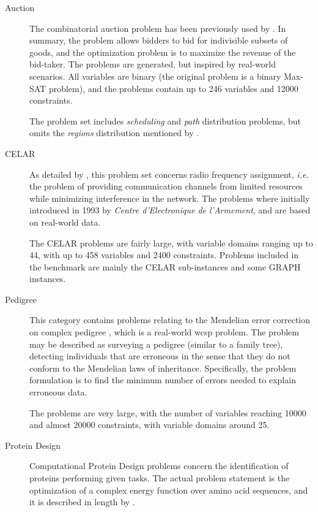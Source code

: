\begin{description}
	\item[Auction]
		The combinatorial auction problem has been previously used by \textcites{Larrosa08}{Sandholm99}.
		In summary, the problem allows bidders to bid for indivisible subsets of goods, and the optimization problem is to maximize the revenue of the bid-taker.
		The problems are generated, but inspired by real-world scenarios.
		All variables are binary (the original problem is a binary Max-SAT problem), and the problems contain up to \num{246} variables and \num{12000} constraints.

		The problem set includes \emph{scheduling} and \emph{path} distribution problems, but omits the \emph{regions} distribution mentioned by \textcite[\pno~228]{Larrosa08}.

	\item[CELAR]
		As detailed by \textcite{Cabon99}, this problem set concerns radio frequency assignment, \emph{i.e.} the problem of providing communication channels from limited resources while minimizing interference in the network.
		The problems where initially introduced in 1993 by \emph{Centre d’Electronique de l’Armement}, and are based on real-world data.

		The CELAR problems are fairly large, with variable domains ranging up to \num{44}, with up to \num{458} variables and \num{2400} constraints.
		Problems included in the benchmark are mainly the CELAR sub-instances \parencite[\pno~85]{Cabon99} and some GRAPH instances.

	\item[Pedigree]
		This category contains problems relating to the Mendelian error correction on complex pedigree \parencite{Sanchez08}, which is a real-world \gls{wcsp} problem.
		The problem may be described as surveying a pedigree (similar to a family tree), detecting individuals that are erroneous in the sense that they do not conform to the Mendelian laws of inheritance.
		Specifically, the problem formulation is to find the minimum number of errors needed to explain erroneous data.

		The problems are very large, with the number of variables reaching \num{10000} and almost \num{20000} constraints, with variable domains around \num{25}.

	\item[Protein Design]
		Computational Protein Design problems concern the identification of proteins performing given tasks. The actual problem statement is the optimization of a complex energy function over amino acid sequences, and it is described in length by \textcite{Allouche12}.


\end{description}
